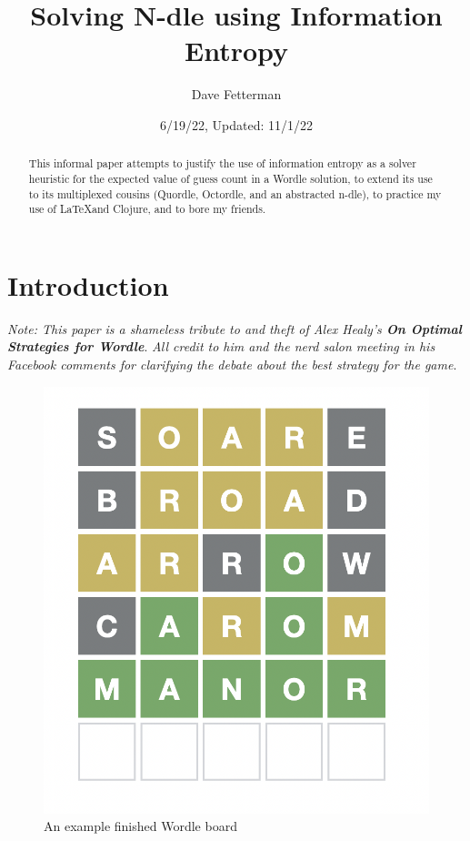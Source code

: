 \documentclass[11pt, oneside]{article} 	%
\title{Solving N-dle using Information Entropy}
\author{Dave Fetterman}
\affil{Obviously Unemployed}
\date{6/19/22, Updated: 11/1/22}
\begin{document}
\maketitle

\begin{abstract}

This informal paper attempts to justify the use of information entropy as a solver heuristic for the expected value of guess count in a Wordle solution, to extend its use to its multiplexed cousins (Quordle, Octordle, and an abstracted n-dle), to practice my use of \LaTeX and Clojure, and to bore my friends.

\end{abstract}

\section{Introduction}

\emph{Note: This paper is a shameless tribute to and theft of Alex Healy's \textbf{On Optimal Strategies for Wordle}}\cite{1}. \emph{All credit to him and the nerd salon meeting in his Facebook comments for clarifying the debate about the best strategy for the game}.
 
\begin{figure}
\centering
\includegraphics[scale=.3]{wordle}
\caption{An example finished Wordle board}
\end{figure}
\end{document}
